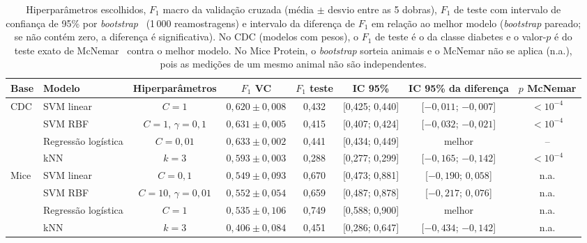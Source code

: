 \documentclass[aps,pre,twocolumn,10pt,nofootinbib]{revtex4-2}
\begin{document}
\begin{table}[t]
\caption{Hiperparâmetros escolhidos, $F_1$ macro da validação cruzada
(média $\pm$ desvio entre as 5 dobras), $F_1$ de teste com intervalo de
confiança de 95\% por \textit{bootstrap}~\cite{efron1993} (1\,000
reamostragens) e intervalo
da diferença de $F_1$ em relação ao melhor modelo (\textit{bootstrap}
pareado; se não contém zero, a diferença é significativa). No CDC (modelos
com pesos), o $F_1$ de teste é o da classe diabetes e o valor-$p$ é do teste
exato de McNemar~\cite{mcnemar1947} contra o melhor modelo. No Mice Protein, o
\textit{bootstrap} sorteia animais e o McNemar não se aplica (n.a.), pois
as medições de um mesmo animal não são independentes.}
\label{tab:sig}
\begin{ruledtabular}
\begin{tabular}{llcccccc}
Base & Modelo & Hiperparâmetros & $F_1$ VC & $F_1$ teste & IC 95\% & IC 95\% da diferença & $p$ McNemar \\
\hline
CDC  & SVM linear          & $C=1$                    & $0{,}620 \pm 0{,}008$ & 0,432 & [0,425; 0,440] & [$-0{,}011$; $-0{,}007$] & $<10^{-4}$ \\
     & SVM RBF             & $C=1$, $\gamma=0{,}1$    & $0{,}631 \pm 0{,}005$ & 0,415 & [0,407; 0,424] & [$-0{,}032$; $-0{,}021$] & $<10^{-4}$ \\
     & Regressão logística & $C=0{,}01$               & $0{,}633 \pm 0{,}002$ & 0,441 & [0,434; 0,449] & melhor & -- \\
     & kNN                 & $k=3$                    & $0{,}593 \pm 0{,}003$ & 0,288 & [0,277; 0,299] & [$-0{,}165$; $-0{,}142$] & $<10^{-4}$ \\
\hline
Mice & SVM linear          & $C=0{,}1$                & $0{,}549 \pm 0{,}093$ & 0,670 & [0,473; 0,881] & [$-0{,}190$; $0{,}058$]  & n.a. \\
     & SVM RBF             & $C=10$, $\gamma=0{,}01$  & $0{,}552 \pm 0{,}054$ & 0,659 & [0,487; 0,878] & [$-0{,}217$; $0{,}076$]  & n.a. \\
     & Regressão logística & $C=1$                    & $0{,}535 \pm 0{,}106$ & 0,749 & [0,588; 0,900] & melhor & n.a. \\
     & kNN                 & $k=3$                    & $0{,}406 \pm 0{,}084$ & 0,451 & [0,286; 0,647] & [$-0{,}434$; $-0{,}142$] & n.a. \\
\end{tabular}
\end{ruledtabular}
\end{table}
\end{document}
